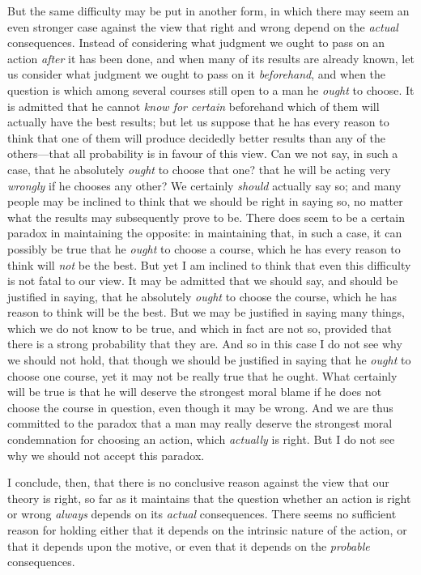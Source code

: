 But the same difficulty may be put in another form, in which there may
seem an even stronger case against the view that right and wrong
depend on the \textit{actual} consequences. Instead of considering
what judgment we ought to pass on an action \textit{after} it has been
done, and when many of its results are already known, let us consider
what judgment we ought to pass on it \textit{beforehand}, and when the
question is which among several courses still open to a man he
\textit{ought} to choose. It is admitted that he cannot 
\textit{know for certain} beforehand which of them will actually have
the best results; but let us suppose that he has every reason to think
that one of them will produce decidedly better results than any of the
others---that all probability is in favour of this view. Can we not
say, in such a case, that he absolutely \textit{ought} to choose that
one? that he will be acting very \textit{wrongly} if he chooses any
other? We certainly \textit{should} actually say so; and many people
may be inclined to think that we should be right in saying so, no
matter what the results may subsequently prove to be. There does seem
to be a certain paradox in maintaining the opposite: in maintaining
that, in such a case, it can possibly be true that he \textit{ought}
to choose a course, which he has every reason to think will
\textit{not} be the best. But yet I am inclined to think that even
this difficulty is not fatal to our view. It may be admitted that we
should say, and should be justified in saying, that he absolutely
\textit{ought} to choose the course, which he has reason to think will
be the best. But we may be justified in saying many things, which we
do not  know to be true, and which in fact are not so,
provided that there is a strong probability that they are. And so in
this case I do not see why we should not hold, that though we should
be justified in saying that he \textit{ought} to choose one course,
yet it may not be really true that he ought. What certainly will be
true is that he will deserve the strongest moral blame if he does not
choose the course in question, even though it may be wrong. And we are
thus committed to the paradox that a man may really deserve the
strongest moral condemnation for choosing an action, which
\textit{actually} is right. But I do not see why we should not accept
this paradox.

I conclude, then, that there is no conclusive reason against the view
that our theory is right, so far as it maintains that the question
whether an action is right or wrong \textit{always} depends on its
\textit{actual} consequences. There seems no sufficient reason for
holding either that it depends on the intrinsic nature of the action,
or that it depends upon the motive, or even that it depends on the
\textit{probable} consequences.

